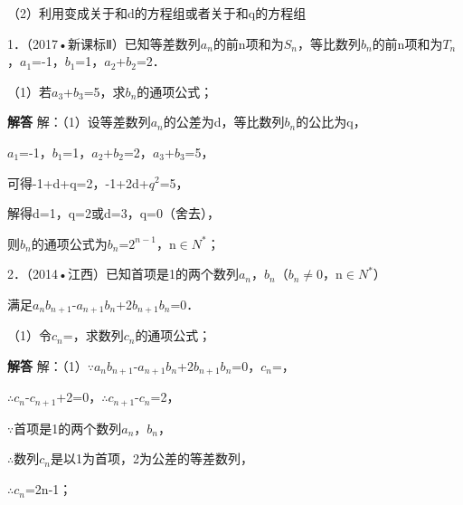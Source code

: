（2）利用变成关于和d的方程组或者关于和q的方程组\par
{}
1．（2017•新课标Ⅱ）已知等差数列{\ensuremath{a_{n}}}的前n项和为\ensuremath{S_{n}}，等比数列{\ensuremath{b_{n}}}的前n项和为\ensuremath{T_{n}}，\ensuremath{a_{1}}=-1，\ensuremath{b_{1}}=1，\ensuremath{a_{2}}+\ensuremath{b_{2}}=2．\par
（1）若\ensuremath{a_{3}}+\ensuremath{b_{3}}=5，求{\ensuremath{b_{n}}}的通项公式；\par
\QuestionSpace{3.5cm}
\ifshowanswers
\par\begingroup\color{solutioncolor}\noindent\textbf{解答}\quad
解：（1）设等差数列{\ensuremath{a_{n}}}的公差为d，等比数列{\ensuremath{b_{n}}}的公比为q，\par
\ensuremath{a_{1}}=-1，\ensuremath{b_{1}}=1，\ensuremath{a_{2}}+\ensuremath{b_{2}}=2，\ensuremath{a_{3}}+\ensuremath{b_{3}}=5，\par
可得-1+d+q=2，-1+2d+\ensuremath{q^{2}}=5，\par
解得d=1，q=2或d=3，q=0（舍去），\par
则{\ensuremath{b_{n}}}的通项公式为\ensuremath{b_{n}}=\ensuremath{2^{n-1}}，n\ensuremath{\in}\ensuremath{N^*}；\par
\par\endgroup\fi

2．（2014•江西）已知首项是1的两个数列{\ensuremath{a_{n}}}，{\ensuremath{b_{n}}}（\ensuremath{b_{n}}\ensuremath{\ne}0，n\ensuremath{\in}\ensuremath{N^{*}}）\par
满足\ensuremath{a_{n}}\ensuremath{b_{n+1}}-\ensuremath{a_{n+1}}\ensuremath{b_{n}}+2\ensuremath{b_{n+1}}\ensuremath{b_{n}}=0．\par
（1）令\ensuremath{c_{n}}=，求数列{\ensuremath{c_{n}}}的通项公式；\par
\QuestionSpace{3.5cm}
\ifshowanswers
\par\begingroup\color{solutioncolor}\noindent\textbf{解答}\quad
解：（1）\ensuremath{\because}\ensuremath{a_{n}}\ensuremath{b_{n+1}}-\ensuremath{a_{n+1}}\ensuremath{b_{n}}+2\ensuremath{b_{n+1}}\ensuremath{b_{n}}=0，\ensuremath{c_{n}}=，\par
\ensuremath{\therefore}\ensuremath{c_{n}}-\ensuremath{c_{n+1}}+2=0，\ensuremath{\therefore}\ensuremath{c_{n+1}}-\ensuremath{c_{n}}=2，\par
\ensuremath{\because}首项是1的两个数列{\ensuremath{a_{n}}}，{\ensuremath{b_{n}}}，\par
\ensuremath{\therefore}数列{\ensuremath{c_{n}}}是以1为首项，2为公差的等差数列，\par
\ensuremath{\therefore}\ensuremath{c_{n}}=2n-1；\par
\par\endgroup\fi

